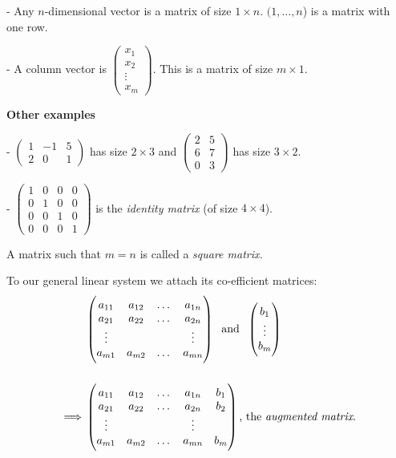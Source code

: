 \documentclass[10pt]{scrartcl}
\begin{document}
- Any $n$-dimensional vector is a matrix of size $1\times n$. $(1,\dots, n$) is a matrix with one row.

- A column vector is $\left(\begin{smallmatrix}
x_1\\x_2\\\vdots\\x_m	
\end{smallmatrix}\right)$. This is a matrix of size $m\times 1$. 

\textbf{Other examples}

- $\begin{pmatrix}
1 & -1 & 5\\ 2 & 0 & 1	
\end{pmatrix}
$ has size $2 \times 3$ and $\begin{pmatrix}
2 & 5\\ 6 & 7\\ 0 & 3	
\end{pmatrix}$ has size $3\times 2$. 

- $\begin{pmatrix} 
1 & 0 & 0 &0 \\
0 & 1 & 0 & 0 \\
0 & 0 & 1 & 0 \\
0 & 0 & 0 &1	
\end{pmatrix}
$ is the \emph{identity matrix} (of size $4\times 4$). 

A matrix such that $m = n$ is called a \emph{square matrix.} 

To our general linear system we attach its co-efficient matrices:
\begin{align*}
 & \begin{pmatrix}
  a_{11} & a_{12} &\dots & a_{1n} \\
  a_{21} & a_{22} & \dots &a_{2n}\\
  \vdots & & & \vdots\\
  a_{m1} & a_{m2} & \dots &a_{mn}	
  \end{pmatrix}
 \;\text{ and }\;
 \begin{pmatrix}
 b_1\\ \vdots\\ b_m	
 \end{pmatrix}\\[0.5cm]
  \implies & \begin{pmatrix}
  a_{11} & a_{12} &\dots & a_{1n} & b_1 \\
  a_{21} & a_{22} & \dots &a_{2n} & b_2\\
  \vdots & & & \vdots\\
  a_{m1} & a_{m2} & \dots &a_{mn} &b_m	
  \end{pmatrix} \text{, the \emph{augmented matrix}.}
\end{align*}
\end{document}
